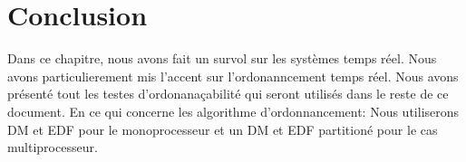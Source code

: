\section{Conclusion}
Dans ce chapitre, nous avons fait un survol sur les systèmes temps
réel. Nous avons particulierement mis l'accent sur l'ordonanncement
temps réel. Nous avons présenté tout les testes d'ordonanaçabilité qui
seront utilisés dans le reste de ce document. En ce qui concerne les
algorithme d'ordonnancement: Nous utiliserons DM et EDF pour le
monoprocesseur et un DM et EDF partitioné pour le cas multiprocesseur.
